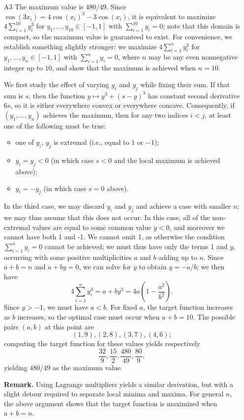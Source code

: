 \documentclass[amssymb,twocolumn,pra,10pt,aps]{revtex4-1}
\begin{document}
\begin{itemize}
\item[A3]
The maximum value is $480/49$.
Since $\cos(3x_i) = 4 \cos(x_i)^3 - 3 \cos(x_i)$, it is equivalent to maximize $4 \sum_{i=1}^{10} y_i^3$
for $y_1,\dots,y_{10} \in [-1,1]$ with $\sum_{i=1}^{10} y_i = 0$; 
note that this domain is compact, so the maximum value is guaranteed to exist.
For convenience, we establish something slightly stronger: we maximize $4 \sum_{i=1}^{n} y_i^3$
for $y_1,\dots,y_{n} \in [-1,1]$ with $\sum_{i=1}^{n} y_i = 0$, where $n$ may be any even nonnegative integer up to $10$,
and show that the maximum is achieved when $n=10$.

We first study the effect of varying $y_i$ and $y_j$ while fixing their sum. If that sum is $s$,
then the function $y \mapsto y^3 + (s-y)^3$ has constant second derivative $6s$, so it is either everywhere convex or everywhere concave. Consequently, if $(y_1,\dots,y_{n})$ achieves the maximum, then for any two indices $i<j$,
at least one of the following must be true:
\begin{itemize}
\item one of $y_i$, $y_j$ is extremal (i.e., equal to $1$ or $-1$);
\item $y_i = y_j < 0$ (in which case $s<0$ and the local maximum is achieved above);
\item $y_i = -y_j$ (in which case $s=0$ above).
\end{itemize}
In the third case, we may discard $y_i$ and $y_j$ and achieve a case with smaller $n$; we may thus assume that this does not occur. In this case, all of the non-extremal values are equal to some common value $y < 0$, and moreover we cannot have both 1 and -1. We cannot omit 1, as otherwise the condition $\sum_{i=1}^{n} y_i = 0$ cannot be achieved;
we must thus have only the terms 1 and $y$, occurring with some positive multiplicities $a$ and $b$ adding up to $n$. 
Since $a+b=n$ and $a+by = 0$, we can solve for $y$ to obtain $y = -a/b$; we then have
\[
4\sum_{i=1}^n y_i^3 = a + by^3 = 4a \left( 1 - \frac{a^2}{b^2} \right).
\]
Since $y > -1$, we must have $a < b$. For fixed $a$, the target function increases as $b$ increases,
so the optimal case must occur when $a+b=10$. The possible pairs $(a,b)$ at this point are
\[
(1,9), (2,8), (3,7), (4,6);
\]
computing the target function for these values yields respectively
\[
\frac{32}{9}, \frac{15}{2}, \frac{480}{49}, \frac{80}{9},
\]
yielding $480/49$ as the maximum value.

\noindent
\textbf{Remark.}
Using Lagrange multipliers yields a similar derivation, but with a slight detour required to separate local minima and maxima. For general $n$, the above argument shows that the target function is maximized when $a+b=n$.


\end{itemize}
\end{document}
